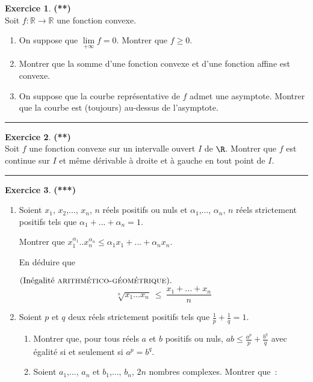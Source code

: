 \documentclass[a4paper,11pt]{article}
\theoremstyle{definition}
\newtheorem{exo}{Exercice} %
\begin{document}
\begin{minipage}{1\linewidth}
\begin{minipage}[t]{0.48\linewidth}
		\begin{exo}\textbf{(**)}\quad\\[0.2cm]
		Soit $f:\mathbb R\to\mathbb R$ une fonction convexe. 
		\begin{enumerate}
			\item On suppose que $\lim\limits_{+\infty}f=0$. Montrer que $f\geq 0$.
			\item Montrer que la somme d'une fonction convexe et d'une fonction affine est convexe.
			\item On suppose que la courbe représentative de $f$ admet une asymptote. Montrer que la courbe est (toujours) au-dessus
			de l'asymptote.
		\end{enumerate}
		
		\centering
		\rule{1\linewidth}{0.6pt}
	\end{exo}
	
		
		
		
	\end{minipage}	
	\hfill\vrule\hfill
	\begin{minipage}[t]{0.48\linewidth}
		\raggedright
		
		\begin{exo}\textbf{(**)}\quad\\[0.2cm]
			Soit $f$ une fonction convexe sur un intervalle ouvert $I$ de $\R$. Montrer que $f$ est continue sur $I$ et même dérivable à droite et à gauche en tout point de $I$.
			
			\centering
			\rule{1\linewidth}{0.6pt}
		\end{exo}
		
		
		
		\begin{exo}\textbf{(***)}\quad\\[0.2cm]
			\begin{enumerate}
				\item  Soient $x_1$, $x_2$,..., $x_n$, $n$ réels positifs ou nuls et $\alpha_1$,..., $\alpha_n$, $n$ réels strictement positifs tels que $\alpha_1+...+\alpha_n=1$.
				
				 Montrer que $x_1^{\alpha_1}..x_n^{\alpha_n}\leq\alpha_1x_1+...+\alpha_nx_n$.
				 
				  En déduire que
				  
				  $(\mbox{Inégalité \textsc{arithmético-géométrique}}).$\quad\\[-0.2cm]
				  
				   $$\sqrt[n]{x_1...x_n} \ \leq \ \dfrac{x_1+...+x_n}{n}$$
				\item  Soient $p$ et $q$ deux réels strictement positifs tels que $\frac{1}{p}+\frac{1}{q}=1$.
				\begin{enumerate}
					\item Montrer que, pour tous réels $a$ et $b$ positifs ou nuls, $ab\leq\frac{a^p}{p}+\frac{b^q}{q}$ avec égalité si et seulement si $a^p=b^q$. 
					\item Soient $a_1$,..., $a_n$ et $b_1$,..., $b_n$, $2n$ nombres complexes. Montrer que~:
					

\end{enumerate}
\end{enumerate}
\end{exo}
\end{minipage}
\end{minipage}
\end{document}
